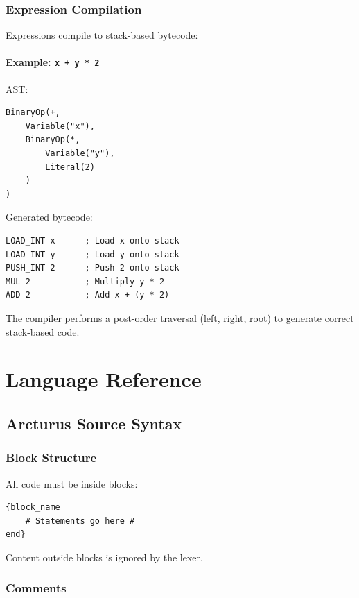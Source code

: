 \documentclass[11pt,a4paper]{article}
\begin{document}
\subsubsection{Expression Compilation}

Expressions compile to stack-based bytecode:

\paragraph{Example: \texttt{x + y * 2}}

AST:
\begin{verbatim}
BinaryOp(+,
    Variable("x"),
    BinaryOp(*,
        Variable("y"),
        Literal(2)
    )
)
\end{verbatim}

Generated bytecode:
\begin{verbatim}
LOAD_INT x      ; Load x onto stack
LOAD_INT y      ; Load y onto stack
PUSH_INT 2      ; Push 2 onto stack
MUL 2           ; Multiply y * 2
ADD 2           ; Add x + (y * 2)
\end{verbatim}

The compiler performs a post-order traversal (left, right, root) to generate correct stack-based code.

\newpage
\section{Language Reference}

\subsection{Arcturus Source Syntax}

\subsubsection{Block Structure}

All code must be inside blocks:

\begin{lstlisting}[style=arcturuscode]
{block_name
    # Statements go here #
end}
\end{lstlisting}

Content outside blocks is ignored by the lexer.

\subsubsection{Comments}
\end{document}
